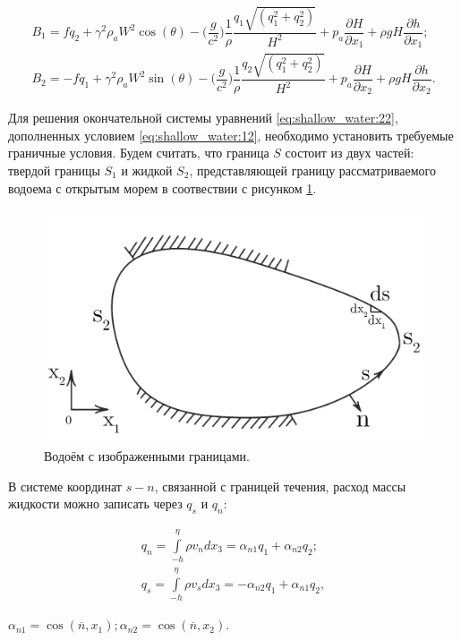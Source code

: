 \documentclass[14pt]{extreport}
\begin{document}

\begin{equation*}
\begin{aligned}
B_1=fq_2+\gamma^2\rho_aW^2\cos(\theta)-\bigg(\dfrac{g}{c^2}\bigg)\dfrac{1}{\rho}\dfrac{q_1\sqrt{(q_1^2+q_2^2)}}{H^2} + p_a \dfrac{\partial H}{\partial x_1} + \rho gH\dfrac{\partial h}{\partial x_1}; \\
B_2=-fq_1+\gamma^2\rho_aW^2\sin(\theta)-\bigg(\dfrac{g}{c^2}\bigg)\dfrac{1}{\rho}\dfrac{q_2\sqrt{(q_1^2+q_2^2)}}{H^2} + p_a \dfrac{\partial H}{\partial x_2} + \rho gH\dfrac{\partial h}{\partial x_2}.
\end{aligned}
\end{equation*}

Для решения окончательной системы уравнений \eqref{eq:shallow_water:22}, дополненных условием \eqref{eq:shallow_water:12}, необходимо установить требуемые граничные условия. Будем считать, что граница $S$ состоит из двух частей: твердой границы $S_1$ и жидкой $S_2$, представляющей границу рассматриваемого водоема с открытым морем в соотвествии с рисунком \ref{img:shallow_water:3}.

\begin{figure}[H]
\centerline{\includegraphics[width=0.5\linewidth]{images/shallow_water_3}}
\caption{Водоём с изображенными границами.}
\label{img:shallow_water:3}
\end{figure}

В системе координат $s-n$, связанной с границей течения, расход массы жидкости можно записать через $q_s$ и $q_n$:

\begin{equation}\label{eq:shallow_water:24}
\begin{aligned}
q_n=\int\limits^\eta_{-h} \rho v_n dx_3= \alpha_{n1}q_1+\alpha_{n2}q_2; \\
q_s=\int\limits^\eta_{-h} \rho v_s dx_3= -\alpha_{n2}q_1+\alpha_{n1}q_2,
\end{aligned}
\end{equation}

 $\alpha_{n1}=\cos(\overline{n},x_1); \alpha_{n2}=\cos(\overline{n},x_2).$
\end{document}
